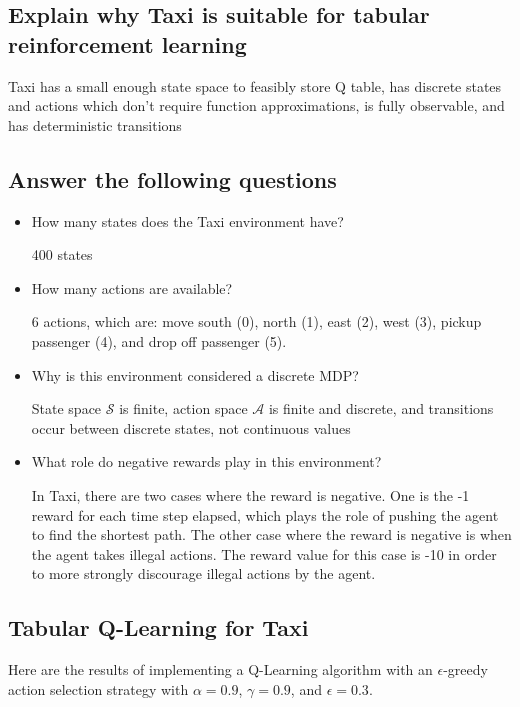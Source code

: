 \documentclass[11pt]{article}
\begin{document}
\subsection*{Explain why Taxi is suitable for tabular reinforcement learning}

Taxi has a small enough state space to feasibly store Q table, has discrete states and actions which don't require function approximations, is fully observable, and has deterministic transitions

\subsection*{Answer the following questions}

\begin{itemize}
    \item How many states does the Taxi environment have?
    
    400 states

    \item How many actions are available?
    
    6 actions, which are: move south (0), north (1), east (2), west (3), pickup passenger (4), and drop off passenger (5).

    \item Why is this environment considered a discrete MDP?
    
    State space $\mathcal{S}$ is finite, action space $\mathcal{A}$ is finite and discrete, and transitions occur between discrete states, not continuous values

    \item What role do negative rewards play in this environment?
    
    In Taxi, there are two cases where the reward is negative. One is the -1 reward for each time step elapsed, which plays the role of pushing the agent to find the shortest path. The other case where the reward is negative is when the agent takes illegal actions. The reward value for this case is -10 in order to more strongly discourage illegal actions by the agent.
\end{itemize}

\subsection*{Tabular Q-Learning for Taxi}

Here are the results of implementing a Q-Learning algorithm with an $\epsilon$-greedy action selection strategy with $\alpha = 0.9$, $\gamma = 0.9$, and $\epsilon = 0.3$.
\end{document}
